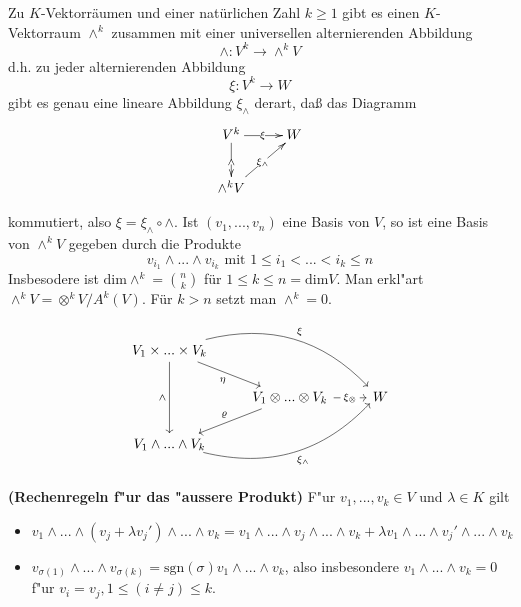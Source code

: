 \documentclass[9pt, a4paper, twocolumn, landscape]{article}
\begin{document}
\begin{theorem}
Zu $K$-Vektorräumen und einer natürlichen Zahl $k \geq 1$ gibt es einen $K$-Vektorraum
$\wedge^k$  zusammen mit einer universellen alternierenden Abbildung 
$$
\wedge: V^k \rightarrow \wedge ^k V
$$
d.h. zu jeder alternierenden Abbildung 
$$
\xi: V^k \rightarrow W
$$
gibt es genau eine lineare Abbildung $\xi_{\wedge}$ derart, daß das Diagramm 
\begin{gather*}
  \xymatrix{V^k   \ar[d]|{\wedge} \ar[r]|{\xi} & W\\
    \wedge^k V \ar[ur]|{\xi_\wedge} & }
\end{gather*}

kommutiert, also $\xi = \xi_\wedge \circ \wedge$. Ist $(v_1,...,v_n)$ eine Basis von $V$, so ist eine Basis von $\wedge^k V$ gegeben durch die Produkte 
$$
v_{i_1} \wedge ... \wedge v_{i_k} \text{ mit } 1 \leq i_1 < ... <  i_k \leq n
$$
Insbesodere ist $\mathrm{dim}\wedge^k = \binom{n}{k}$ für $ 1 \leq k \leq n = \mathrm{dim}V$. 
Man erkl"art \\ $\wedge^k V = \otimes^k V / A^k(V)$.
Für $k>n$ setzt man $
\wedge^k = 0.$

\begin{equation*}
\begin{tikzcd}
V_1 \times ... \times V_k \arrow[rd, "\eta"'] \arrow[rrd, "\xi", bend left] \arrow[dd, "\wedge"'] &                                                                                         &   \\
                                                                                                  & V_1 \otimes ... \otimes V_k \arrow[r, "\xi_\otimes" description] \arrow[ld, "\varrho"'] & W \\
V_1 \wedge ... \wedge V_k \arrow[rru, "\xi_\wedge"', bend right, shift left]                      &                                                                                         &  
\end{tikzcd}
\end{equation*}
\end{theorem}


\begin{remark}\textbf{(Rechenregeln f"ur das "aussere Produkt)}
F"ur $v_1, ..., v_k \in V$ und $\lambda \in K$ gilt
\begin{itemize}
\item $v_1 \wedge ... \wedge (v_j + \lambda v_j') \wedge ... \wedge v_k = v_1 \wedge ... \wedge v_j \wedge ... \wedge v_k + \lambda v_1 \wedge ... \wedge v_j' \wedge ... \wedge v_k$
\item $v_{\sigma(1)} \wedge ... \wedge v_{\sigma(k)} = \mathrm{sgn}(\sigma) v_1 \wedge ... \wedge v_k$, also insbesondere $v_1 \wedge ... \wedge v_k = 0$ f"ur $v_i = v_j, 1 \leq (i \neq j) \leq k$.
\end{itemize}
\end{remark}
\end{document}
